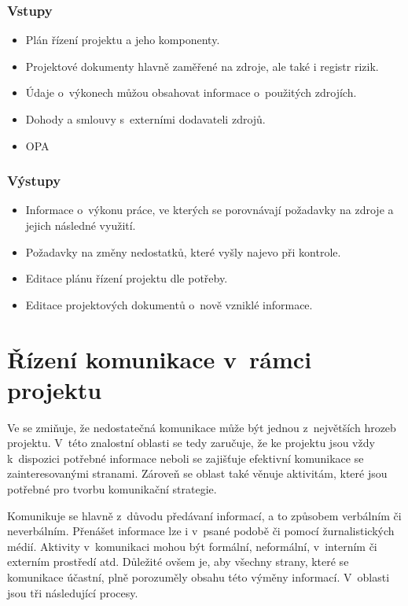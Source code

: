 \subsubsection*{Vstupy}
\begin{itemize}
    \item Plán řízení projektu a jeho komponenty.
    \item Projektové dokumenty hlavně zaměřené na zdroje, ale také i registr rizik.
    \item Údaje o~výkonech můžou obsahovat informace o~použitých zdrojích.
    \item Dohody a smlouvy s~externími dodavateli zdrojů.
    \item OPA
\end{itemize}
\subsubsection*{Výstupy}
\begin{itemize}
    \item Informace o~výkonu práce, ve kterých se porovnávají požadavky na zdroje a jejich následné využití.
    \item Požadavky na změny nedostatků, které vyšly najevo při kontrole.
    \item Editace plánu řízení projektu dle potřeby.
    \item Editace projektových dokumentů o~nově vzniklé informace.
\end{itemize}


\section{Řízení komunikace v~rámci projektu}

Ve \cite{StrategieRizeni} se zmiňuje, že nedostatečná komunikace může být jednou z~největších hrozeb projektu. V~této znalostní oblasti se tedy zaručuje, že ke projektu jsou vždy k~dispozici potřebné informace neboli se zajišťuje efektivní komunikace se zainteresovanými stranami. Zároveň se oblast také věnuje aktivitám, které jsou potřebné pro tvorbu komunikační strategie. 

Komunikuje se hlavně z~důvodu předávaní informací, a to způsobem verbálním či neverbálním. Přenášet informace lze i v~psané podobě či pomocí žurnalistických médií. Aktivity v~komunikaci mohou být formální, neformální, v~interním či externím prostředí atd. Důležité ovšem je, aby všechny strany, které se komunikace účastní, plně porozuměly obsahu této výměny informací. V~oblasti jsou tři následující procesy.

